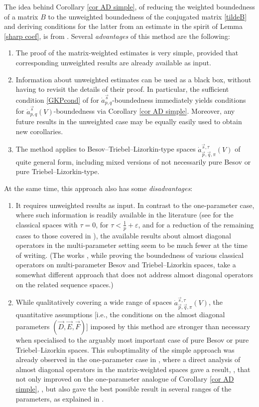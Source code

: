 \documentclass[11pt, reqno]{amsart}
\theoremstyle{definition}
\theoremstyle{remark}
\numberwithin{equation}{section}
\newcommand{\vD}{\vec D}
\newcommand{\vE}{\vec E}
\newcommand{\vF}{\vec F}
\newcommand{\vp}{\vec p}
\newcommand{\vq}{\vec q}
\newcommand{\vs}{\vec s}
\newcommand{\atau}{\dot a^{\vs,\tau}_{\vp,\vq,\pi}}
\begin{document}
The idea behind Corollary \ref{cor AD simple}, of reducing the weighted boundedness of a matrix $B$ to the unweighted boundedness of the conjugated matrix \eqref{tildeB} and deriving conditions for the latter from an estimate in the spirit of Lemma \ref{sharp coef}, is from \cite[Theorem 2.6]{FR21}. Several {\em advantages} of this method are the following:
\begin{enumerate}[\rm(i)]
\item The proof of the matrix-weighted estimates is very simple, provided that corresponding unweighted results are already available as input.
\item Information about unweighted estimates can be used as a black box, without having to revisit the details of their proof. In particular, the sufficient condition \eqref{GKPcond} of \cite[Theorem 5.2]{GKP21} for $\dot a^{\vs}_{p,q}$-boundedness immediately yields conditions for $\dot a^{\vs}_{p,q}(V)$-boundedness via Corollary \ref{cor AD simple}. Moreover, any future results in the unweighted case may be equally easily used to obtain new corollaries.
\item The method applies to Besov--Triebel--Lizorkin-type spaces $\atau(V)$ of quite general form, including mixed versions of not necessarily pure Besov or pure Triebel--Lizorkin-type.
\end{enumerate}

At the same time, this approach also has some {\em disadvantages}:
\begin{enumerate}[\rm(i)]
\item It requires unweighted results as input. In contrast to the one-para\-meter case, where such information is readily available in the literature (see \cite[Theorem 3.3]{FJ90} for the classical spaces with $\tau=0$, \cite[Theorem 4.1]{YY10} for $\tau<\frac1p+\varepsilon$, and \cite[Theorem 1]{YY13} for a reduction of the remaining cases to those covered in \cite{FJ90}), the available results about almost diagonal operators in the multi-parameter setting seem to be much fewer at the time of writing. (The works \cite{CLL16,DLM10,LuZhu13,Xu22}, while proving the boundedness of various classical operators on multi-parameter Besov and Triebel--Lizorkin spaces, take a somewhat different approach that does not address almost diagonal operators on the related sequence spaces.)

\item While qualitatively covering a wide range of spaces $\atau(V)$, the quantitative assumptions [i.e., the conditions on the almost diagonal parameters $(\vD,\vE,\vF)$] imposed by this method are stronger than necessary when specialised to the arguably most important case of pure Besov or pure Triebel--Lizorkin spaces. This suboptimality of the simple approach was already observed in the one-parameter case in \cite{BHYY:1b}, where a direct analysis of almost diagonal operators in the matrix-weighted spaces gave a result, \cite[Theorem 13.1]{BHYY:1b}, that not only improved on the one-parameter analogue of Corollary \ref{cor AD simple}, \cite[Theorem 4.7]{BHYY:1b}, but also gave the best possible result in several ranges of the parameters, as explained in \cite[Remark 13.2]{BHYY:1b}.
\end{enumerate}
\end{document}
